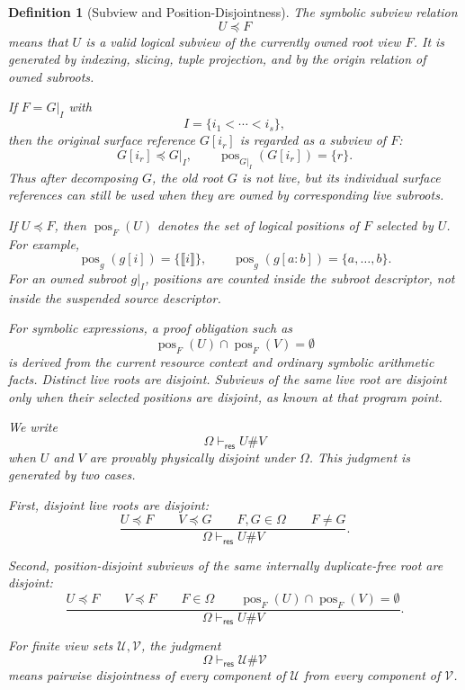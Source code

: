 \documentclass[acmsmall,screen,review,anonymous,nonacm]{acmart}
\newtheorem{definition}{Definition}[section]
\theoremstyle{defn_style}
\begin{document}
\begin{definition}[Subview and Position-Disjointness]
The symbolic subview relation
\[
U\preceq F
\]
means that \(U\) is a valid logical subview of the currently owned root view
\(F\). It is generated by indexing, slicing, tuple projection, and by the
origin relation of owned subroots.

If \(F=G|_I\) with
\[
I=\{i_1<\cdots<i_s\},
\]
then the original surface reference \(G[i_r]\) is regarded as a subview of
\(F\):
\[
G[i_r]\preceq G|_I,
\qquad
\operatorname{pos}_{G|_I}(G[i_r])=\{r\}.
\]
Thus after decomposing \(G\), the old root \(G\) is not live, but its individual
surface references can still be used when they are owned by corresponding
live subroots.

If \(U\preceq F\), then \(\operatorname{pos}_F(U)\) denotes the set of logical
positions of \(F\) selected by \(U\). For example,
\[
\operatorname{pos}_g(g[i])=\{\llbracket i\rrbracket\},
\qquad
\operatorname{pos}_g(g[a{:}b])=\{a,\ldots,b\}.
\]
For an owned subroot \(g|_I\), positions are counted inside the subroot
descriptor, not inside the suspended source descriptor.

For symbolic expressions, a proof obligation such as
\[
\operatorname{pos}_F(U)\cap\operatorname{pos}_F(V)=\emptyset
\]
is derived from the current resource context and ordinary symbolic arithmetic
facts. Distinct live roots are disjoint. Subviews of the same live root are
disjoint only when their selected positions are disjoint, as known at that
program point.

We write
\[
\Omega\vdash_{\mathsf{res}} U\# V
\]
when \(U\) and \(V\) are provably physically disjoint under \(\Omega\). This
judgment is generated by two cases.

First, disjoint live roots are disjoint:
\[
\frac{
U\preceq F
\qquad
V\preceq G
\qquad
F,G\in\Omega
\qquad
F\ne G
}{
\Omega\vdash_{\mathsf{res}} U\# V
}.
\]

Second, position-disjoint subviews of the same internally duplicate-free root
are disjoint:
\[
\frac{
U\preceq F
\qquad
V\preceq F
\qquad
F\in\Omega
\qquad
\operatorname{pos}_F(U)\cap\operatorname{pos}_F(V)=\emptyset
}{
\Omega\vdash_{\mathsf{res}} U\# V
}.
\]

For finite view sets \(\mathcal U,\mathcal V\), the judgment
\[
\Omega\vdash_{\mathsf{res}}\mathcal U\#\mathcal V
\]
means pairwise disjointness of every component of \(\mathcal U\) from every
component of \(\mathcal V\).
\end{definition}
\end{document}
